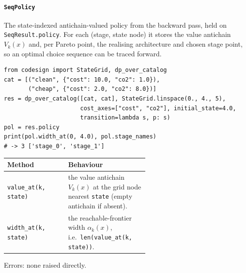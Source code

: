 \documentclass[11pt,a4paper]{article}
\begin{document}
\paragraph{\texttt{SeqPolicy}}\label{ref:sequential:seqpolicy}
The state-indexed antichain-valued policy from the backward pass, held on
\texttt{SeqResult.\allowbreak policy}. For each (stage, state node) it stores
the value
antichain $V_k(x)$ and, per Pareto point, the realising architecture and
chosen stage point, so an optimal choice sequence can be traced forward.
\begin{lstlisting}
from codesign import StateGrid, dp_over_catalog
cat = [("clean", {"cost": 10.0, "co2": 1.0}),
       ("cheap", {"cost": 2.0, "co2": 8.0})]
res = dp_over_catalog([cat, cat], StateGrid.linspace(0., 4., 5),
                      cost_axes=["cost", "co2"], initial_state=4.0,
                      transition=lambda s, p: s)
pol = res.policy
print(pol.width_at(0, 4.0), pol.stage_names)
# -> 3 ['stage_0', 'stage_1']
\end{lstlisting}
\begin{center}
\begin{tabular}{@{}lp{0.58\linewidth}@{}}
\toprule
Method & Behaviour \\
\midrule
\texttt{value\_at(k, state)} & the value antichain $V_k(x)$ at the grid node
  nearest \texttt{state} (empty antichain if absent). \\
\texttt{width\_at(k, state)} & the reachable-frontier width $\alpha_k(x)$,
  i.e.\ \texttt{len(value\_at(k, state))}. \\
\bottomrule
\end{tabular}
\end{center}
Errors: none raised directly.
\end{document}
